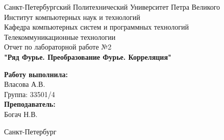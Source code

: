 \documentclass[a4paper]{article}
\begin{document}

\begin{titlepage}	%

	\begin{center}		%

		\large Санкт-Петербургский Политехнический Университет Петра Великого\\
		\large Институт компьютерных наук и технологий \\
		\large Кафедра компьютерных систем и программных технологий\\[6cm]
		
		\huge Телекоммуникационные технологии\\[0.5cm] %
		\large Отчет по лабораторной работе №2 \\[0.2cm]
		\large\textbf{"Ряд Фурье. Преобразование Фурье. Корреляция"}\\[5cm]

	\end{center}


	\begin{flushright} %
		\begin{minipage}{0.25\textwidth} %
			\begin{flushleft} %

				\large\textbf{Работу выполнила:}\\
				\large Власова А.В.\\
				\large {Группа:} 33501/4\\
				
				\large \textbf{Преподаватель:}\\
				\large Богач Н.В.\

			\end{flushleft}
		\end{minipage}
	\end{flushright}
	
	\vfill %

	\begin{center}
	\large Санкт-Петербург\\
	\large \the\year %
	\end{center} %

\thispagestyle{empty} %
\end{titlepage} %
\end{document}

